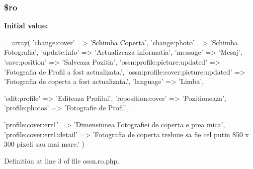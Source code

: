 \subsubsection[{\texorpdfstring{\$ro}{$ro}}]{\setlength{\rightskip}{0pt plus 5cm}\$ro}\hypertarget{components_2_ossn_profile_2locale_2ossn_8ro_8php_ad432e1965f7fa8ce0807b244734e70f8}{}\label{components_2_ossn_profile_2locale_2ossn_8ro_8php_ad432e1965f7fa8ce0807b244734e70f8}
{\bfseries Initial value\+:}
\begin{DoxyCode}
= array(
        \textcolor{stringliteral}{'change:cover'} => \textcolor{stringliteral}{'Schimba Coperta'},
        \textcolor{stringliteral}{'change:photo'} => \textcolor{stringliteral}{'Schimba Fotografia'},
        \textcolor{stringliteral}{'update:info'} => \textcolor{stringliteral}{'Actualizeaza informatia'},
        \textcolor{stringliteral}{'message'} => \textcolor{stringliteral}{'Mesaj'},
        \textcolor{stringliteral}{'save:position'} => \textcolor{stringliteral}{'Salveaza Pozitia'},
        \textcolor{stringliteral}{'ossn:profile:picture:updated'} => \textcolor{stringliteral}{'Fotografia de Profil a fost actualizata.'},
        \textcolor{stringliteral}{'ossn:profile:cover:picture:updated'} => \textcolor{stringliteral}{'Fotografia de coperta a fost actualizata.'},
        \textcolor{stringliteral}{'language'} => \textcolor{stringliteral}{'Limba'},
        
        \textcolor{stringliteral}{'edit:profile'} => \textcolor{stringliteral}{'Editeaza Profilul'},
        \textcolor{stringliteral}{'reposition:cover'} => \textcolor{stringliteral}{'Pozitioneaza'},
        \textcolor{stringliteral}{'profile:photos'} => \textcolor{stringliteral}{'Fotografie de Profil'},
        
        \textcolor{stringliteral}{'profile:cover:err1'} => \textcolor{stringliteral}{'Dimensiunea Fotografiei de coperta e prea mica'},
        \textcolor{stringliteral}{'profile:cover:err1:detail'} => \textcolor{stringliteral}{'Fotografia de coperta trebuie sa fie cel putin 850 x 300 pixeli sau
       mai mare.'}
)
\end{DoxyCode}


Definition at line 3 of file ossn.\+ro.\+php.

